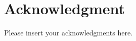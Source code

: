 \documentclass[lettersize,journal]{IEEEtran}
\begin{document}





\section*{Acknowledgment}
Please insert your acknowledgments here.



\end{document}
